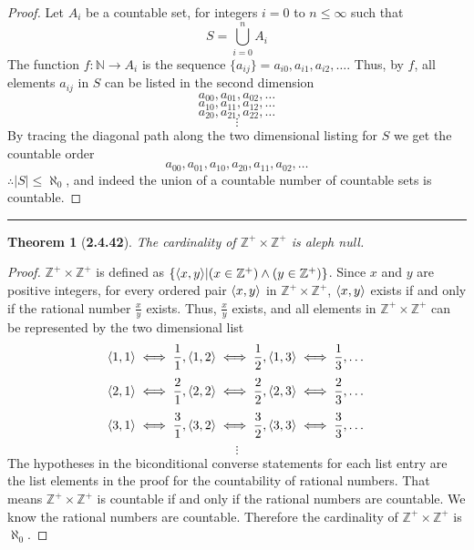 \documentclass[a4paper, 12pt]{article}
\theoremstyle{plain}
\newtheorem*{theorem*}{Theorem}
\DeclarePairedDelimiter{\ord}{\langle}{\rangle}
\begin{document}
\begin{proof}
    Let $A_i$ be a countable set, for integers $i=0$ to $n \leq \infty$ 
    such that
    $$S = \bigcup_{i=0}^{n} A_i$$ 
    The function $f: \mathbb{N} \rightarrow A_i$ is the sequence 
    $\{a_{ij}\} = a_{i0}, a_{i1}, a_{i2}, \dots$. 
    Thus, by $f$, all elements $a_{ij}$ in $S$ can be listed in the second dimension
    $$a_{00}, a_{01}, a_{02}, \dots$$
    $$a_{10}, a_{11}, a_{12}, \dots$$
    $$a_{20}, a_{21}, a_{22}, \dots$$
    $$\vdots$$
    By tracing the diagonal path along the two 
    dimensional listing for $S$ we get the countable order 
    $$a_{00}, a_{01}, a_{10}, a_{20}, a_{11}, a_{02}, \dots$$
    $\therefore |S| \leq \aleph_0$, and indeed the union of a countable number of 
    countable sets is countable.
\end{proof}
\begin{center}
    \rule{5.4in}{1pt}
\end{center}


\begin{theorem*}[\textbf{2.4.42}]
    The cardinality of $\mathbb{Z^{+}} \times \mathbb{Z^{+}}$ is aleph null.
\end{theorem*}

\begin{proof}
    $\mathbb{Z^{+}} \times \mathbb{Z^{+}}$ is defined as 
    $\{\ord{x, y} | (x \in \mathbb{Z^{+}}) \land (y \in \mathbb{Z^{+}})\}$. 
    Since $x$ and $y$ are positive integers, for every ordered pair $\ord{x, y}$ in 
    $\mathbb{Z^{+}} \times \mathbb{Z^{+}}$, $\ord{x, y}$ exists if and only if the rational number 
    $\frac{x}{y}$ exists. Thus, $\frac{x}{y}$ exists, and all elements in 
    $\mathbb{Z^{+}} \times \mathbb{Z^{+}}$ can be represented by the two dimensional list
    $$\ord{1,1} \iff \frac{1}{1}, \ord{1,2} \iff \frac{1}{2}, \ord{1,3} \iff \frac{1}{3}, \dots$$
    $$\ord{2,1} \iff \frac{2}{1}, \ord{2,2} \iff \frac{2}{2}, \ord{2,3} \iff \frac{2}{3}, \dots$$
    $$\ord{3,1} \iff \frac{3}{1}, \ord{3,2} \iff \frac{3}{2}, \ord{3,3} \iff \frac{3}{3}, \dots$$
    $$\vdots$$
    The hypotheses in the biconditional converse statements for each list entry are the list 
    elements in the proof for the countability of rational numbers. That means 
    $\mathbb{Z^{+}} \times \mathbb{Z^{+}}$ is countable if and only if the rational numbers are 
    countable. We know the rational numbers are countable. Therefore the cardinality of 
    $\mathbb{Z^{+}} \times \mathbb{Z^{+}}$ is $\aleph_0$.
\end{proof}
\end{document}
